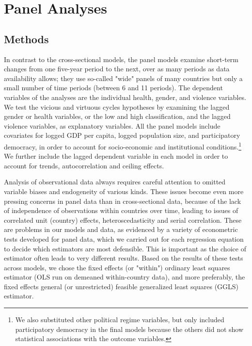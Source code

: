 \documentclass[12pt]{article}
\begin{document}
\section{Panel Analyses}

\subsection{Methods}


In contrast to the cross-sectional models, the panel models examine short-term changes from one five-year period to the next, over as many periods as data availability allows; they use so-called "wide" panels of many countries but only a small number of time periods (between 6 and 11 periods).
The dependent variables of the analyses are the individual health, gender, and violence variables.
We test the vicious and virtuous cycles hypotheses by examining the lagged gender or health variables, or the low and high classification, and the lagged violence variables, as explanatory variables.
All the panel models include covariates for logged GDP per capita, logged population size, and participatory democracy, in order to account for socio-economic and institutional conditions.\footnote{We also substituted other political regime variables, but only included participatory democracy in the final models because the others did not show statistical associations with the outcome variables.}
We further include the lagged dependent variable in each model in order to account for trends, autocorrelation and ceiling effects.

Analysis of observational data always requires careful attention to omitted variable biases and endogeneity of various kinds.
These issues become even more pressing concerns in panel data than in cross-sectional data, because of the lack of independence of observations within countries over time, leading to issues of correlated unit (country) effects, heteroscedasticity and serial correlation.
These are problems in our models and data, as evidenced by a variety of econometric tests developed for panel data, which we carried out for each regression equation to decide which estimators are most defensible.
This is important as the choice of estimator often leads to very different results.
Based on the results of these tests across models, we chose the fixed effects (or "within") ordinary least squares estimator (OLS run on demeaned within-country data), and more preferably, the fixed effects general (or unrestricted) feasible generalized least squares (GGLS) estimator.
\end{document}
